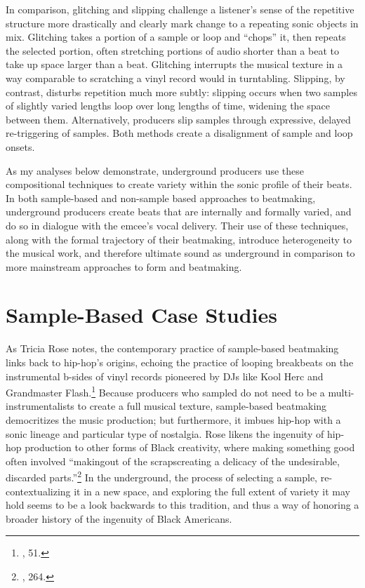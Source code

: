 In comparison, glitching and slipping challenge a listener's sense of the repetitive structure more drastically and clearly mark change to a repeating sonic objects in mix. Glitching takes a portion of a sample or loop and ``chops'' it, then repeats the selected portion, often stretching portions of audio shorter than a beat to take up space larger than a beat. Glitching interrupts the musical texture in a way comparable to scratching a vinyl record would in turntabling. Slipping, by contrast, disturbs repetition much more subtly: slipping occurs when two samples of slightly varied lengths loop over long lengths of time, widening the space between them. Alternatively, producers slip samples through expressive, delayed re-triggering of samples. Both methods create a disalignment of sample and loop onsets.

As my analyses below demonstrate, underground producers use these compositional techniques to create variety within the sonic profile of their beats. In both sample-based and non-sample based approaches to beatmaking, underground producers create beats that are internally and formally varied, and do so in dialogue with the emcee's vocal delivery. Their use of these techniques, along with the formal trajectory of their beatmaking, introduce heterogeneity to the musical work, and therefore ultimate sound as underground in comparison to more mainstream approaches to form and beatmaking.
\section{Sample-Based Case Studies}
 As Tricia Rose notes, the contemporary practice of sample-based beatmaking links back to hip-hop's origins, echoing the practice of looping breakbeats on the instrumental b-sides of vinyl records pioneered by DJs like Kool Herc and Grandmaster Flash.\footnote{\cite{triciaroseBlackNoiseRap1994}, 51.} Because producers who sampled do not need to be a multi-instrumentalists to create a full musical texture, sample-based beatmaking democritizes the music production; but furthermore, it imbues hip-hop with a sonic lineage and particular type of nostalgia. Rose likens the ingenuity of hip-hop production to other forms of Black creativity, where making something good often involved ``making\textellipsis out of the scraps\textemdash creating a delicacy of the undesirable, discarded parts.''\footnote{\cite{triciaroseHipHopWarsWhat2008}, 264.} In the underground, the process of selecting a sample, re-contextualizing it in a new space, and exploring the full extent of variety it may hold seems to be a look backwards to this tradition, and thus a way of honoring a broader history of the ingenuity of Black Americans.

